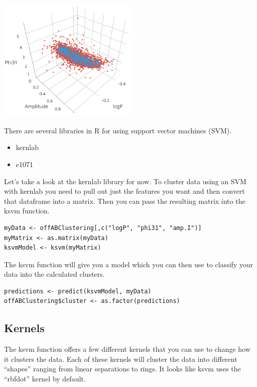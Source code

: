 \begin{center}
	\includegraphics[width=0.5\textwidth]{images/ksvm_01.png}
\end{center}

There are several libraries in R for using support vector machines (SVM).

\begin{itemize}
	\item kernlab
	\item e1071
\end{itemize}

Let's take a look at the kernlab library for now. To cluster data using an SVM with kernlab you need to pull out just the features you want and then convert that dataframe into a matrix. Then you can pass the resulting matrix into the ksvm function.

\begin{verbatim}
myData <- offABClustering[,c("logP", "phi31", "amp.I")]
myMatrix <- as.matrix(myData)
ksvmModel <- ksvm(myMatrix)
\end{verbatim}

The ksvm function will give you a model which you can then use to classify your data into the calculated clusters.

\begin{verbatim}
predictions <- predict(ksvmModel, myData)
offABClustering$cluster <- as.factor(predictions)
\end{verbatim}

\subsection{Kernels}
The ksvm function offers a few different kernels that you can use to change how it clusters the data. Each of these kernels will cluster the data into different ``shapes'' ranging from linear separations to rings. It looks like ksvm uses the ``rbfdot'' kernel by default.

